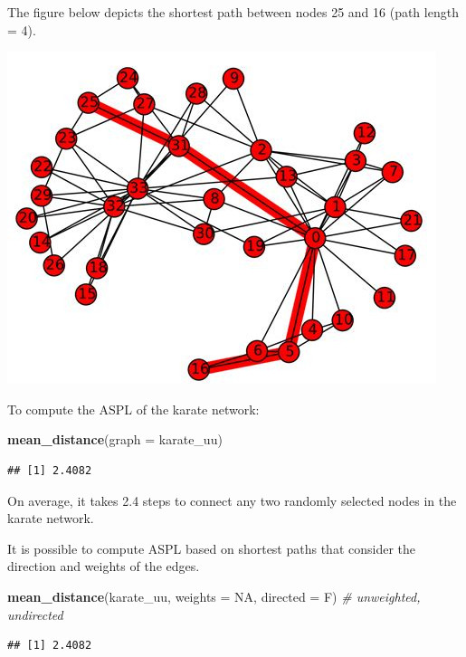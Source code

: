 \documentclass[
]{book}
\newenvironment{Shaded}{\begin{snugshade}}{\end{snugshade}}
\newcommand{\AttributeTok}[1]{\textcolor[rgb]{0.13,0.29,0.53}{#1}}
\newcommand{\CommentTok}[1]{\textcolor[rgb]{0.56,0.35,0.01}{\textit{#1}}}
\newcommand{\ConstantTok}[1]{\textcolor[rgb]{0.56,0.35,0.01}{#1}}
\newcommand{\FunctionTok}[1]{\textcolor[rgb]{0.13,0.29,0.53}{\textbf{#1}}}
\newcommand{\NormalTok}[1]{#1}
\begin{document}
The figure below depicts the shortest path between nodes 25 and 16 (path length = 4).

\includegraphics{images/shortest-path.jpeg}

To compute the ASPL of the karate network:

\begin{Shaded}
\begin{Highlighting}[]
\FunctionTok{mean\_distance}\NormalTok{(}\AttributeTok{graph =}\NormalTok{ karate\_uu)}
\end{Highlighting}
\end{Shaded}

\begin{verbatim}
## [1] 2.4082
\end{verbatim}

On average, it takes 2.4 steps to connect any two randomly selected nodes in the karate network.

It is possible to compute ASPL based on shortest paths that consider the direction and weights of the edges.

\begin{Shaded}
\begin{Highlighting}[]
\FunctionTok{mean\_distance}\NormalTok{(karate\_uu, }\AttributeTok{weights =} \ConstantTok{NA}\NormalTok{, }\AttributeTok{directed =}\NormalTok{ F) }\CommentTok{\# unweighted, undirected}
\end{Highlighting}
\end{Shaded}

\begin{verbatim}
## [1] 2.4082
\end{verbatim}
\end{document}
